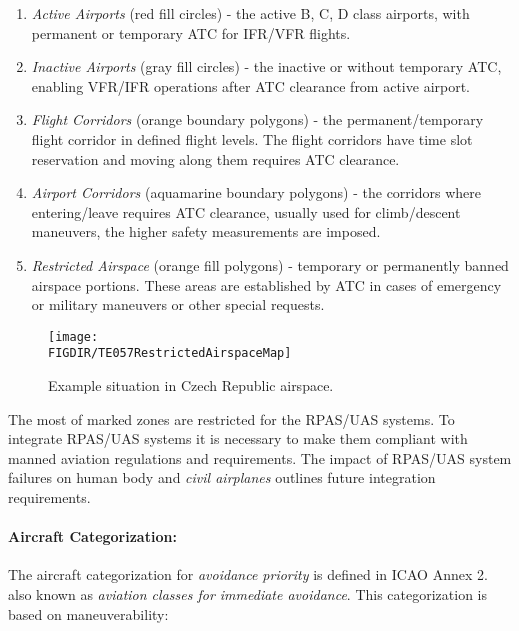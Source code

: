 \begin{enumerate}
    \item \emph{Active Airports} (red fill circles) - the active B, C, D class airports, with permanent or temporary ATC for IFR/VFR flights.
    
    \item \emph{Inactive Airports} (gray fill circles) - the inactive or without temporary ATC, enabling VFR/IFR operations after ATC clearance from active airport. 
    
    \item \emph{Flight Corridors} (orange boundary polygons) - the permanent/temporary flight corridor in defined flight levels. The flight corridors have time slot reservation and moving along them requires ATC clearance. 
    
    \item \emph{Airport Corridors} (aquamarine boundary polygons) - the corridors where entering/leave requires ATC clearance, usually used for climb/descent maneuvers, the higher safety measurements are imposed.
    
    \item \emph{Restricted Airspace} (orange fill polygons) - temporary or permanently banned airspace portions. These areas are established by ATC in cases of emergency or military maneuvers or other special requests.
\end{enumerate}
\begin{figure}[H]
    \centering
    \texttt{[image: \\FIGDIR/TE057RestrictedAirspaceMap]}
    \caption{Example situation in Czech Republic airspace.}
    \label{fig:exampleSituationCzechAirspace}
\end{figure}

\begin{note}
    The most of marked zones are restricted for the RPAS/UAS systems. To integrate RPAS/UAS systems it is necessary to make them compliant with manned aviation regulations and requirements. The impact of RPAS/UAS system failures on human body \cite{authority2013human} and \emph{civil airplanes} \cite{weibel2004safety} outlines future integration requirements.
\end{note}

\paragraph{Aircraft Categorization:} The aircraft categorization for \emph{avoidance priority} is defined in ICAO Annex 2. \cite{icaoAnnex2} also known as \emph{aviation classes for immediate avoidance}. This categorization is based on maneuverability:

